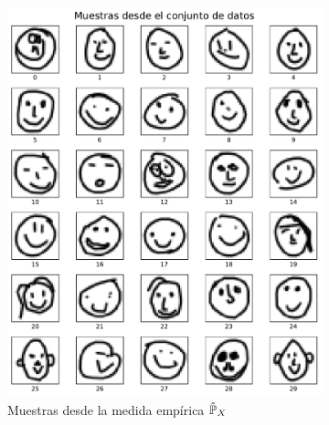 \begin{figure}[htbp]
    \centering
    \begin{subfigure}[b]{0.45\textwidth}
        \centering
        \includegraphics[width=\textwidth]{img/distr-sampler/UniformDiscreteSampler-6x5.pdf}
        \caption{Muestras desde la medida empírica $\hat\Prob_X$}
        \label{fig:sample-empirico}
    \end{subfigure}
    \hfill
    \begin{subfigure}[b]{0.45\textwidth}
        \centering

\end{subfigure}
\end{figure}
